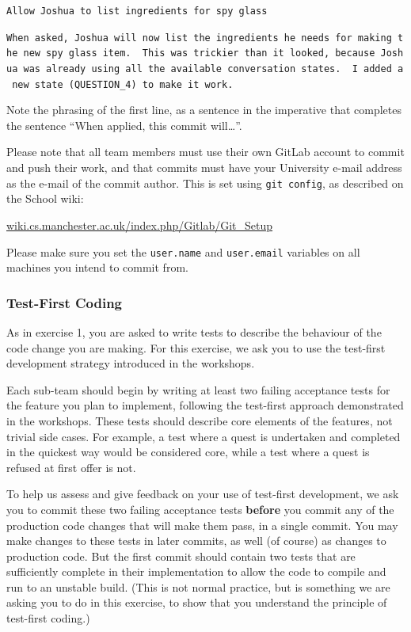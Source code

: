 \documentclass[
]{book}
\begin{document}
\texttt{Allow\ Joshua\ to\ list\ ingredients\ for\ spy\ glass}

\texttt{When\ asked,\ Joshua\ will\ now\ list\ the\ ingredients\ he\ needs\ for\ making\ the\ new\ spy\ glass\ item.\ \ This\ was\ trickier\ than\ it\ looked,\ because\ Joshua\ was\ already\ using\ all\ the\ available\ conversation\ states.\ \ I\ added\ a\ new\ state\ (QUESTION\_4)\ to\ make\ it\ work.}

Note the phrasing of the first line, as a sentence in the imperative that completes the sentence ``When applied, this commit will\ldots{}''.

Please note that all team members must use their own GitLab account to commit and push their work, and that commits must have your University e-mail address as the e-mail of the commit author. This is set using \texttt{git\ config}, as described on the School wiki:

\href{https://wiki.cs.manchester.ac.uk/index.php/Gitlab/Git_Setup}{wiki.cs.manchester.ac.uk/index.php/Gitlab/Git\_Setup}

Please make sure you set the \texttt{user.name} and \texttt{user.email} variables on all machines you intend to commit from.

\hypertarget{tfcode}{%
\subsubsection*{Test-First Coding}\label{tfcode}}

As in exercise 1, you are asked to write tests to describe the behaviour of the code change you are making. For this exercise, we ask you to use the test-first development strategy introduced in the workshops.

Each sub-team should begin by writing at least two failing acceptance tests for the feature you plan to implement, following the test-first approach demonstrated in the workshops. These tests should describe core elements of the features, not trivial side cases. For example, a test where a quest is undertaken and completed in the quickest way would be considered core, while a test where a quest is refused at first offer is not.

To help us assess and give feedback on your use of test-first development, we ask you to commit these two failing acceptance tests \textbf{before} you commit any of the production code changes that will make them pass, in a single commit. You may make changes to these tests in later commits, as well (of course) as changes to production code. But the first commit should contain two tests that are sufficiently complete in their implementation to allow the code to compile and run to an unstable build. (This is not normal practice, but is something we are asking you to do in this exercise, to show that you understand the principle of test-first coding.)
\end{document}
